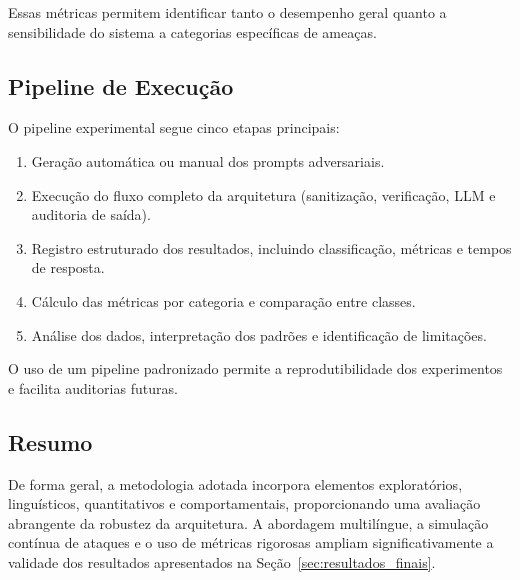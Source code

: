 Essas métricas permitem identificar tanto o desempenho geral quanto a sensibilidade do sistema a categorias específicas de ameaças.

\subsection{Pipeline de Execução}

O pipeline experimental segue cinco etapas principais:

\begin{enumerate}
    \item Geração automática ou manual dos prompts adversariais.
    \item Execução do fluxo completo da arquitetura (sanitização, verificação, LLM e auditoria de saída).
    \item Registro estruturado dos resultados, incluindo classificação, métricas e tempos de resposta.
    \item Cálculo das métricas por categoria e comparação entre classes.
    \item Análise dos dados, interpretação dos padrões e identificação de limitações.
\end{enumerate}

O uso de um pipeline padronizado permite a reprodutibilidade dos experimentos e facilita auditorias futuras.

\subsection{Resumo}

De forma geral, a metodologia adotada incorpora elementos exploratórios, linguísticos, quantitativos e comportamentais, proporcionando uma avaliação abrangente da robustez da arquitetura. A abordagem multilíngue, a simulação contínua de ataques e o uso de métricas rigorosas ampliam significativamente a validade dos resultados apresentados na Seção~\ref{sec:resultados_finais}.
